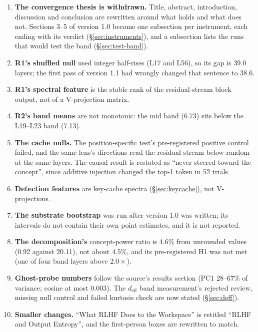 \documentclass[11pt,a4paper]{article}
\begin{document}
\begin{enumerate}[nosep,leftmargin=*,resume]
\item \textbf{The convergence thesis is withdrawn.} Title, abstract,
  introduction, discussion and conclusion are rewritten around what holds
  and what does not. Sections 3--5 of version 1.0 become one subsection
  per instrument, each ending with its verdict (\S\ref{sec:instruments}),
  and a subsection lists the runs that would test the band
  (\S\ref{sec:test-band}).
\item \textbf{R1's shuffled null} used integer half-rises (L17 and L56),
  so its gap is 39.0 layers; the first pass of version 1.1 had wrongly
  changed that sentence to 38.6.
\item \textbf{R1's spectral feature} is the stable rank of the
  residual-stream block output, not of a V-projection matrix.
\item \textbf{R2's band means} are not monotonic: the mid band (6.73)
  sits below the L19--L23 band (7.13).
\item \textbf{The cache nulls.} The position-specific test's
  pre-registered positive control failed, and the same lens's directions
  read the residual stream below random at the same layers. The causal
  result is restated as ``never steered toward the concept'', since
  additive injection changed the top-1 token in 52 trials.
\item \textbf{Detection features} are key-cache spectra
  (\S\ref{sec:keycache}), not V-projections.
\item \textbf{The substrate bootstrap} was run after version 1.0 was
  written; its intervals do not contain their own point estimates, and it
  is not reported.
\item \textbf{The decomposition's} concept-power ratio is 4.6\% from
  unrounded values (0.92 against 20.11), not about 4.5\%, and its
  pre-registered H1 was not met (one of four band layers above
  $2.0\times$).
\item \textbf{Ghost-probe numbers} follow the source's results section
  (PC1 28--67\% of variance; cosine at most 0.003). The $d_\text{eff}$
  band measurement's rejected review, missing null control and failed
  kurtosis check are now stated (\S\ref{sec:deff}).
\item \textbf{Smaller changes.} ``What RLHF Does to the Workspace'' is
  retitled ``RLHF and Output Entropy'', and the first-person boxes are
  rewritten to match.
\end{enumerate}
\end{document}
